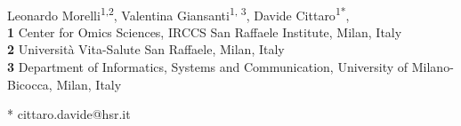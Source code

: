 \documentclass[10pt,letterpaper]{article}
\begin{document}
\vspace*{0.2in}

\begin{flushleft}
{\Large
\textbf{} %
}
\newline
\\
Leonardo Morelli\textsuperscript{1,2},
Valentina Giansanti\textsuperscript{1, 3},
Davide Cittaro\textsuperscript{1*},
\\
\bigskip
\textbf{1} Center for Omics Sciences, IRCCS San Raffaele Institute, Milan, Italy
\\
\textbf{2} Universit\`{a} Vita-Salute San Raffaele, Milan, Italy
\\
\textbf{3} Department of Informatics, Systems and Communication, University of Milano-Bicocca, Milan, Italy
\\
\bigskip

% 
%





* cittaro.davide@hsr.it

\end{flushleft}
\end{document}
